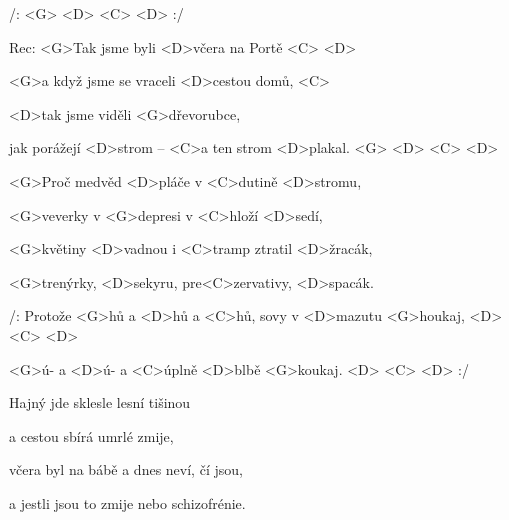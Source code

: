 

/: <G> <D> <C> <D> :/

Rec: <G>Tak jsme byli <D>včera na Portě <C> <D>

<G>a když jsme se vraceli <D>cestou domů, <C>

<D>tak jsme viděli <G>dřevorubce,

jak porážejí <D>strom -- <C>a ten strom <D>plakal. <G> <D> <C> <D>

\zs
<G>Proč medvěd <D>pláče v <C>dutině <D>stromu,

<G>veverky v <G>depresi v <C>hloží <D>sedí,

<G>květiny <D>vadnou i <C>tramp ztratil <D>žracák,

<G>trenýrky, <D>sekyru, pre<C>zervativy, <D>spacák.
\ks

\zr
/: Protože <G>hů a <D>hů a <C>hů, sovy v <D>mazutu <G>houkaj, <D> <C> <D>

<G>ú- a <D>ú- a <C>úplně <D>blbě <G>koukaj. <D> <C> <D> :/
\kr

\zs
Hajný jde sklesle lesní tišinou

a cestou sbírá umrlé zmije,

včera byl na bábě a dnes neví, čí jsou,

a jestli jsou to zmije nebo schizofrénie.
\ks

\zr \kr

\kp
